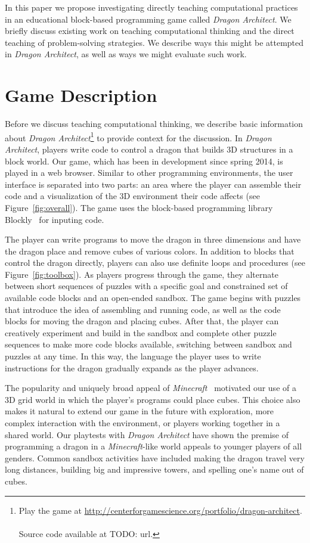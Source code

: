 \documentclass{sig-alternate}
\newcommand{\TODO}[1]{{\color{red} TODO: #1}}
\begin{document}
In this paper we propose investigating directly teaching computational practices in an educational block-based programming game called \emph{Dragon Architect}. 
We briefly discuss existing work on teaching computational thinking and the direct teaching of problem-solving strategies. 
We describe ways this might be attempted in \emph{Dragon Architect}, as well as ways we might evaluate such work. 

\section{Game Description}

Before we discuss teaching computational thinking, we describe basic information about \emph{Dragon Architect}\footnote{Play the game at \url{http://centerforgamescience.org/portfolio/dragon-architect}.\\\\Source code available at \TODO{url}.} to provide context for the discussion.
In \emph{Dragon Architect}, players write code to control a dragon that builds 3D structures in a block world.
Our game, which has been in development since spring 2014, is played in a web browser.
Similar to other programming environments, the user interface is separated into two parts: an area where the player can assemble their code and a visualization of the 3D environment their code affects (see Figure~\ref{fig:overall}). 
The game uses the block-based programming library Blockly~\cite{blockly} for inputing code.

The player can write programs to move the dragon in three dimensions and have the dragon place and remove cubes of various colors. 
In addition to blocks that control the dragon directly, players can also use definite loops and procedures (see Figure~\ref{fig:toolbox}).
As players progress through the game, they alternate between short sequences of puzzles with a specific goal and constrained set of available code blocks and an open-ended sandbox.
The game begins with puzzles that introduce the idea of assembling and running code, as well as the code blocks for moving the dragon and placing cubes.
After that, the player can creatively experiment and build in the sandbox and complete other puzzle sequences to make more code blocks available, switching between sandbox and puzzles at any time. 
In this way, the language the player uses to write instructions for the dragon gradually expands as the player advances.

The popularity and uniquely broad appeal of \emph{Minecraft}~\cite{minecraft} motivated our use of a 3D grid world in which the player's programs could place cubes.
This choice also makes it natural to extend our game in the future with exploration, more complex interaction with the environment, or players working together in a shared world.
Our playtests with \emph{Dragon Architect} have shown the premise of programming a dragon in a \emph{Minecraft}-like world appeals to younger players of all genders.
Common sandbox activities have included making the dragon travel very long distances, building big and impressive towers, and spelling one's name out of cubes.
\end{document}
